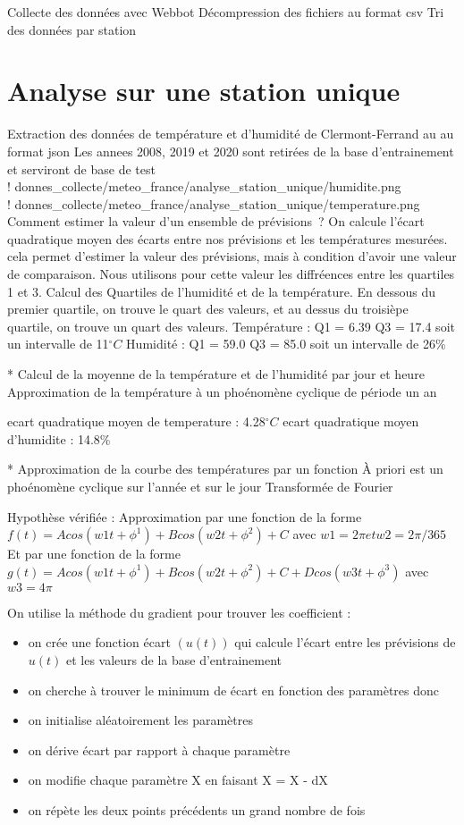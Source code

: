 \documentclass[11pt,a4paper]{article}
\begin{document}
Collecte des données avec Webbot
Décompression des fichiers au format csv
Tri des données par station

\section{Analyse sur une station unique}

Extraction des données de température et d'humidité de Clermont-Ferrand au au format json
Les annees 2008, 2019 et 2020 sont retirées de la base d'entrainement et serviront de base de test\\
! donnes\_collecte/meteo\_france/analyse\_station\_unique/humidite.png\\
! donnes\_collecte/meteo\_france/analyse\_station\_unique/temperature.png\\

Comment estimer la valeur d'un ensemble de prévisions~? On calcule l'écart quadratique moyen des écarts entre nos prévisions et les températures mesurées. cela permet d'estimer la valeur des prévisions, mais à condition d'avoir une valeur de comparaison. Nous utilisons pour cette valeur les diffréences entre les quartiles 1 et 3. Calcul des Quartiles de l'humidité et de la température. En dessous du premier quartile, on trouve le quart des valeurs, et au dessus du troisièpe quartile, on trouve un quart des valeurs. 
Température : Q1 = 6.39  Q3 = 17.4  soit un intervalle de 11${}^{\circ}C$  
Humidité : 	  Q1 = 59.0  Q3 = 85.0  soit un intervalle de 26\%

* Calcul de la moyenne de la température et de l'humidité par jour et heure
Approximation de la température à un phoénomène cyclique de période un an

ecart quadratique moyen de temperature : 4.28${}^{\circ}C$
ecart quadratique moyen d'humidite : 14.8\%

* Approximation de la courbe des températures par un fonction
À priori est un phoénomène cyclique sur l'année et sur le jour
Transformée de Fourier

Hypothèse vérifiée :
Approximation par une fonction de la forme $f(t) = A cos (w1 t + \phi^1) + B cos (w2 t + \phi^2) + C$
avec $w1 = 2 \pi  et w2 = 2 \pi /365$
Et par une fonction de la forme $g(t) = A cos (w1 t + \phi^1) + B cos (w2 t + \phi^2) + C + D cos (w3 t + \phi^3)$
avec $w3 = 4 \pi$

On utilise la méthode du gradient pour trouver les coefficient :
\begin{itemize}
\item on crée une fonction écart $(u(t))$ qui calcule l'écart entre les prévisions de $u(t)$ et les valeurs de la base d'entrainement
\item on cherche à trouver le minimum de écart en fonction des paramètres donc
\item on initialise aléatoirement les paramètres
\item on dérive écart par rapport à chaque paramètre
\item on modifie chaque paramètre X en faisant X = X - dX
\item on répète les deux points précédents un grand nombre de fois
\end{itemize}
\end{document}
